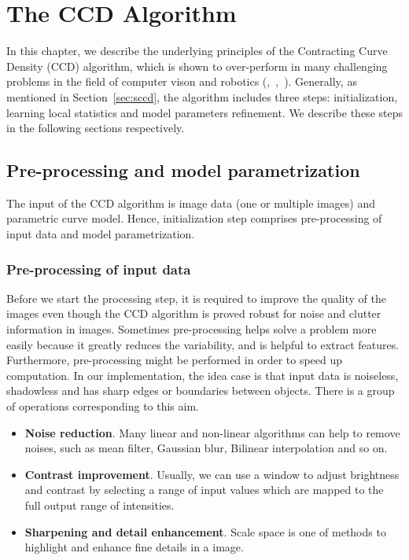 \chapter{The CCD Algorithm}
\label{chapter:ccd}
In this chapter, we describe the underlying principles of the
Contracting Curve Density (CCD) algorithm, which is shown to
over-perform in many challenging problems in the field of computer
vison and robotics (\cite{panin2006fully},~\cite{hanek2004contracting},~\cite{hahn2007tracking}). Generally, as mentioned in Section~\ref{sec:sccd},
the algorithm includes three steps: initialization, learning
local statistics and model parameters refinement. We describe these
steps in the following sections respectively. 
\section{Pre-processing and model parametrization}
\label{sec:init}
The input of the CCD algorithm is image data (one or multiple images)
and parametric curve model. Hence, initialization step comprises
pre-processing of input data and model parametrization.
\subsection{Pre-processing of input data}
\label{sec:pid}

Before we start the processing step, it is required to
improve the quality of the images even though the CCD
algorithm is proved robust for noise and clutter information in
images. Sometimes pre-processing helps solve a problem more easily
because it greatly reduces the variability, and is helpful to extract
features. Furthermore, pre-processing might be performed in order to
speed up computation. In our implementation, the idea case is that
input data is noiseless, shadowless and has sharp edges or boundaries
between objects. There is a group of operations corresponding to this
aim.
\begin{itemize}
\item \textbf{Noise reduction}. Many linear and non-linear algorithms
  can help to remove noises, such as mean filter, Gaussian blur,
  Bilinear interpolation and so on.
\item \textbf{Contrast improvement}. Usually, we can use a window to
  adjust brightness and contrast by selecting a range of input values
  which are mapped to the full output range of intensities.
\item \textbf{Sharpening and detail enhancement}. Scale space is one
  of methods to highlight and enhance fine details in a image.
\end{itemize}

